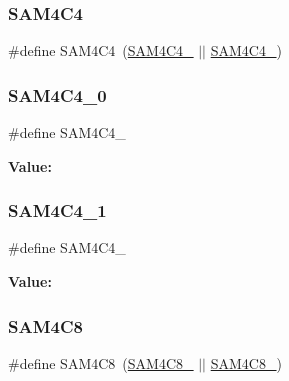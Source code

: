 \subsubsection{\texorpdfstring{SAM4C4}{SAM4C4}}
{\footnotesize\ttfamily \#define S\+A\+M4\+C4~(\mbox{\hyperlink{group__sam__part__macros__group_ga77c44ef9d719d70486f81402ebee7b27}{S\+A\+M4\+C4\+\_}} $\vert$$\vert$ \mbox{\hyperlink{group__sam__part__macros__group_ga0ca9d376eb3cac4e27fb9bd79ec028a6}{S\+A\+M4\+C4\+\_}})}

\mbox{\label{group__sam__part__macros__group_ga77c44ef9d719d70486f81402ebee7b27}} 
\subsubsection{\texorpdfstring{SAM4C4\_0}{SAM4C4\_0}}
{\footnotesize\ttfamily \#define S\+A\+M4\+C4\+\_}

{\bfseries Value\+:}
\begin{DoxyCode}{0}
\DoxyCodeLine{( \(\backslash\)}
\DoxyCodeLine{        )}

\end{DoxyCode}
\mbox{\label{group__sam__part__macros__group_ga0ca9d376eb3cac4e27fb9bd79ec028a6}} 
\subsubsection{\texorpdfstring{SAM4C4\_1}{SAM4C4\_1}}
{\footnotesize\ttfamily \#define S\+A\+M4\+C4\+\_}

{\bfseries Value\+:}
\begin{DoxyCode}{0}
\DoxyCodeLine{( \(\backslash\)}
\DoxyCodeLine{        )}

\end{DoxyCode}
\mbox{\label{group__sam__part__macros__group_ga8a05a38838ed43d62f89266155741aeb}} 
\subsubsection{\texorpdfstring{SAM4C8}{SAM4C8}}
{\footnotesize\ttfamily \#define S\+A\+M4\+C8~(\mbox{\hyperlink{group__sam__part__macros__group_ga6210432e77e4bc0e170dc71370a3e845}{S\+A\+M4\+C8\+\_}} $\vert$$\vert$ \mbox{\hyperlink{group__sam__part__macros__group_ga349700d2ac7573d426776e85f7632361}{S\+A\+M4\+C8\+\_}})}

